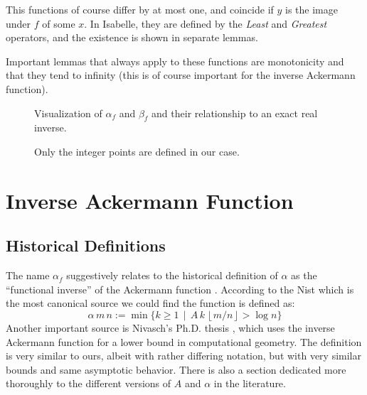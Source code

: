 \documentclass[headsepline,footsepline,footinclude=false,oneside,fontsize=11pt,paper=a4,listof=totoc,bibliography=totoc]{scrbook} %
\begin{document}
This functions of course differ by at most one, and coincide if $y$ is the image under $f$ of some $x$. In Isabelle, they are defined by the \textit{Least} and \textit{Greatest} operators, and the existence is shown in separate lemmas. 

Important lemmas that always apply to these functions are monotonicity and that they tend to infinity (this is of course important for the inverse Ackermann function).

\begin{figure}
	\centering
\caption{Visualization of $\alpha_f$ and $\beta_f$ and their relationship to an exact real inverse.}
\caption*{Only the integer points are defined in our case.}
\end{figure}

\section{Inverse Ackermann Function}
\label{sec:inverseackermann}
\subsection{Historical Definitions}

The name $\alpha_f$ suggestively relates to the historical definition of $\alpha$ as the ``functional inverse'' of the Ackermann function \cite{Tarjan1975b}. According to the Nist \cite{dadsalpha} which is the most canonical source we could find the function is defined as: \begin{equation}
\alpha\,m\,n := \min\{k \geq 1 \, \mid \, A\, k\, \left \lfloor {m/n} \right \rfloor > \log{n} \} 
\end{equation}
Another important source is Nivasch's Ph.D. thesis \cite{navasch09}, which uses the inverse Ackermann function for a lower bound in computational geometry. The definition is very similar to ours, albeit with rather differing notation, but with very similar bounds and same asymptotic behavior. There is also a section dedicated more thoroughly to the different versions of $A$ and $\alpha$ in the literature.
\end{document}
